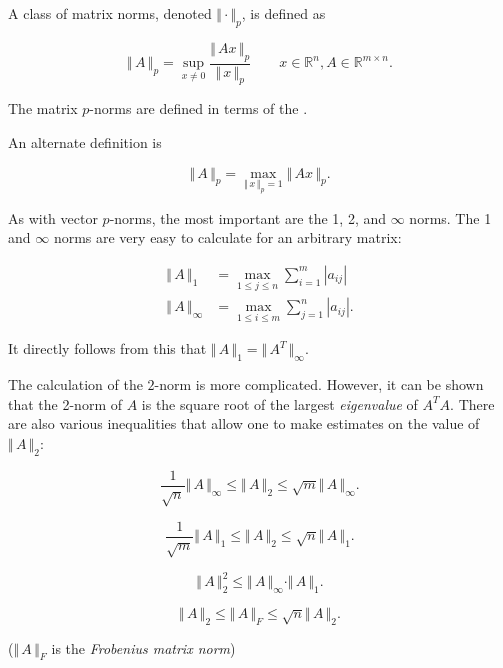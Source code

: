 \documentclass[12pt]{article}
\begin{document}
A class of matrix norms, denoted $\Vert\cdot\Vert_p$, is defined as

\begin{displaymath}
    \Vert\,A\,\Vert_p = \sup_{x\neq0}\frac{\Vert\,Ax\,\Vert_p}{\Vert\,x\,\Vert_p}
\qquad{}x\in\mathbb{R}^n,A\in\mathbb{R}^{m\times n}.
\end{displaymath}

The matrix $p$-norms are defined in terms of the \emph{}.

An alternate definition is

\begin{displaymath}
    \Vert\,A\,\Vert_p = \max_{\Vert\,x\,\Vert_p=1}\Vert\,Ax\,\Vert_p.
\end{displaymath}

As with vector $p$-norms, the most important are the 1, 2, and $\infty$ norms.
The 1 and $\infty$ norms are very easy to calculate for an arbitrary matrix:

\begin{displaymath}
\begin{array}{ll}
    \Vert\,A\,\Vert_1 & = \displaystyle\max_{1\leq j\leq n}\sum_{i=1}^m|a_{ij}| \\
    \Vert\,A\,\Vert_\infty & = \displaystyle\max_{1\leq i\leq m}\sum_{j=1}^n|a_{ij}|.
\end{array}
\end{displaymath}

It directly follows from this that $\Vert\,A\,\Vert_1 = \Vert\,A^T\,\Vert_\infty$.

The calculation of the $2$-norm is more complicated.  However, it can be shown that
the 2-norm of $A$ is the square root of the largest \emph{eigenvalue} of $A^TA$.
There are also various inequalities that allow one to make estimates on the value
of $\Vert\,A\,\Vert_2$:

\begin{equation*}
    \frac{1}{\sqrt{n}}\Vert\,A\,\Vert_\infty \leq \Vert\,A\,\Vert_2 \leq \sqrt{m}\Vert\,A\,\Vert_\infty.
\end{equation*}

\begin{equation*}
    \frac{1}{\sqrt{m}}\Vert\,A\,\Vert_1 \leq \Vert\,A\,\Vert_2 \leq \sqrt{n}\Vert\,A\,\Vert_1 .
\end{equation*}

\begin{equation*}
   \Vert\,A\,\Vert_2^2\leq\Vert\,A\,\Vert_\infty\cdot\Vert\,A\,\Vert_1.
\end{equation*}

\begin{equation*}
    \Vert\,A\,\Vert_2 \leq \Vert\,A\,\Vert_F\leq\sqrt{n}\Vert\,A\,\Vert_2.
\end{equation*}

($\Vert\,A\,\Vert_F$ is the \emph{Frobenius matrix norm})
\end{document}
